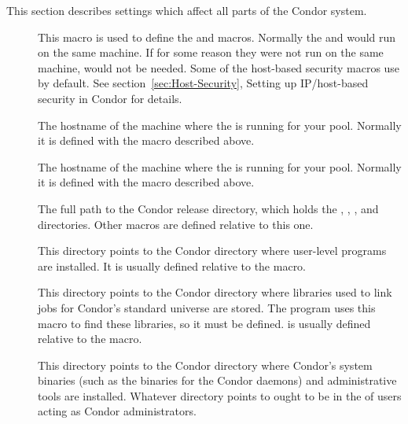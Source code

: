 
This section describes settings which affect all parts of the Condor
system. 
\begin{description}
  
\item[] \label{param:CondorHost} This macro is
  used to define the  and
   macros.  Normally the 
  and  would run on the same machine.  If for some
  reason they were not run on the same machine,
   would not be needed.  Some
  of the host-based security macros use  by
  default.  See section~\ref{sec:Host-Security}, Setting up
  IP/host-based security in Condor for details.
  
\item[] \label{param:CollectorHost} The
  hostname of the machine where the  is running for
  your pool.  Normally it is defined with the
   macro described above.

\item[] \label{param:NegotiatorHost} The
  hostname of the machine where the  is running for
  your pool.  Normally it is defined with the
   macro described above.

\item[] \label{param:ReleaseDir} The full path to
  the Condor release directory, which holds the , ,
  , and  directories.
  Other macros are defined relative to this one.

\item[] \label{param:Bin} This directory points to the
  Condor directory where user-level programs are installed.  It
  is usually defined relative to the  macro.
  
\item[] \label{param:Lib} This directory points to the
  Condor directory where libraries used to link jobs for Condor's
  standard universe are stored.  The  program uses
  this macro to find these libraries, so it must be defined.
   is usually defined relative to the
   macro.

\item[] \label{param:Sbin} This directory points to the
  Condor directory where Condor's system binaries (such as the
  binaries for the Condor daemons) and administrative tools are
  installed.  Whatever directory  points to ought
  to be in the  of users acting as Condor
  administrators.


\end{description}
